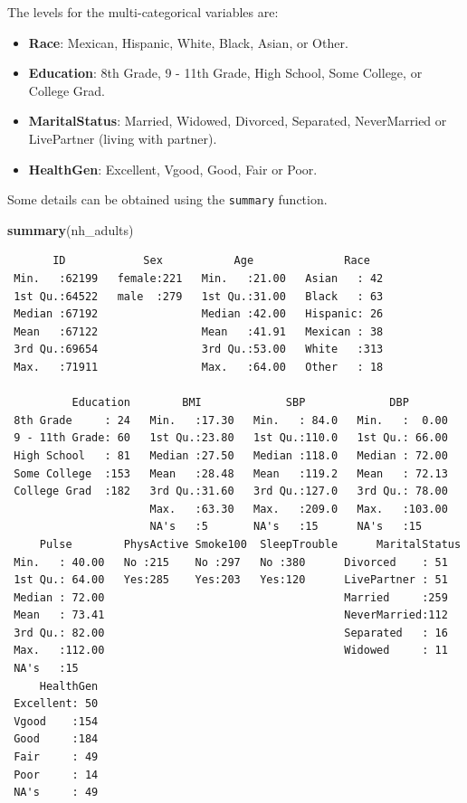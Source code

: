 \documentclass[
]{book}
\newenvironment{Shaded}{\begin{snugshade}}{\end{snugshade}}
\newcommand{\KeywordTok}[1]{\textcolor[rgb]{0.13,0.29,0.53}{\textbf{#1}}}
\newcommand{\NormalTok}[1]{#1}
\providecommand{\tightlist}{%
  \setlength{\itemsep}{0pt}\setlength{\parskip}{0pt}}
\begin{document}
The levels for the multi-categorical variables are:

\begin{itemize}
\tightlist
\item
  \textbf{Race}: Mexican, Hispanic, White, Black, Asian, or Other.
\item
  \textbf{Education}: 8th Grade, 9 - 11th Grade, High School, Some College, or College Grad.
\item
  \textbf{MaritalStatus}: Married, Widowed, Divorced, Separated, NeverMarried or LivePartner (living with partner).
\item
  \textbf{HealthGen}: Excellent, Vgood, Good, Fair or Poor.
\end{itemize}

Some details can be obtained using the \texttt{summary} function.

\begin{Shaded}
\begin{Highlighting}[]
\KeywordTok{summary}\NormalTok{(nh_adults)}
\end{Highlighting}
\end{Shaded}

\begin{verbatim}
       ID            Sex           Age              Race    
 Min.   :62199   female:221   Min.   :21.00   Asian   : 42  
 1st Qu.:64522   male  :279   1st Qu.:31.00   Black   : 63  
 Median :67192                Median :42.00   Hispanic: 26  
 Mean   :67122                Mean   :41.91   Mexican : 38  
 3rd Qu.:69654                3rd Qu.:53.00   White   :313  
 Max.   :71911                Max.   :64.00   Other   : 18  
                                                            
          Education        BMI             SBP             DBP        
 8th Grade     : 24   Min.   :17.30   Min.   : 84.0   Min.   :  0.00  
 9 - 11th Grade: 60   1st Qu.:23.80   1st Qu.:110.0   1st Qu.: 66.00  
 High School   : 81   Median :27.50   Median :118.0   Median : 72.00  
 Some College  :153   Mean   :28.48   Mean   :119.2   Mean   : 72.13  
 College Grad  :182   3rd Qu.:31.60   3rd Qu.:127.0   3rd Qu.: 78.00  
                      Max.   :63.30   Max.   :209.0   Max.   :103.00  
                      NA's   :5       NA's   :15      NA's   :15      
     Pulse        PhysActive Smoke100  SleepTrouble      MaritalStatus
 Min.   : 40.00   No :215    No :297   No :380      Divorced    : 51  
 1st Qu.: 64.00   Yes:285    Yes:203   Yes:120      LivePartner : 51  
 Median : 72.00                                     Married     :259  
 Mean   : 73.41                                     NeverMarried:112  
 3rd Qu.: 82.00                                     Separated   : 16  
 Max.   :112.00                                     Widowed     : 11  
 NA's   :15                                                           
     HealthGen  
 Excellent: 50  
 Vgood    :154  
 Good     :184  
 Fair     : 49  
 Poor     : 14  
 NA's     : 49  
                
\end{verbatim}
\end{document}
